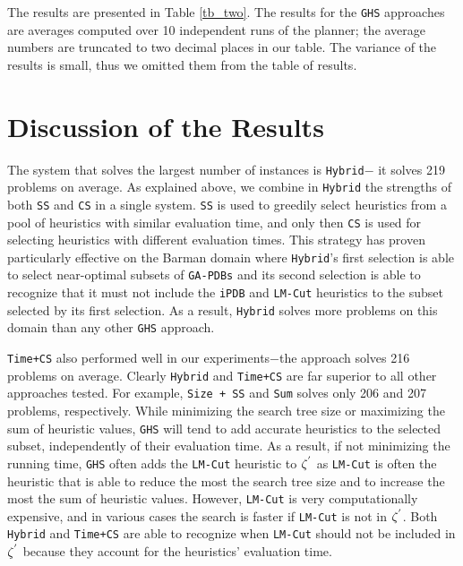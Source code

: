 The results are presented in Table \ref{tb_two}. The results for the \texttt{GHS} approaches are averages computed over 10 independent runs of the planner; the average numbers are truncated to two decimal places in our table. The variance of the results is small, thus we omitted them from the table of results.\\

\section{Discussion of the Results}
\noindent
The system that solves the largest number of instances is \texttt{Hybrid}$-$ it solves 219 problems on average. As explained above, we combine in \texttt{Hybrid} the strengths of both \texttt{SS} and \texttt{CS} in a single system. \texttt{SS} is used to greedily select heuristics from a pool of heuristics with similar evaluation time, and only then \texttt{CS} is used for selecting heuristics with different evaluation times. This strategy has proven particularly effective on the Barman domain where \texttt{Hybrid}'s first selection is able to select near-optimal subsets of \texttt{GA-PDBs} and its second selection is able to recognize that it must not include the \texttt{iPDB} and \texttt{LM-Cut} heuristics to the subset selected by its first selection. As a result, \texttt{Hybrid} solves more problems on this domain than any other \texttt{GHS} approach.

\texttt{Time+CS} also performed well in our experiments$-$the approach solves 216 problems on average. Clearly \texttt{Hybrid} and \texttt{Time+CS} are far superior to all other approaches tested. For example, \texttt{Size + SS} and \texttt{Sum} solves only 206 and 207 problems, respectively. While minimizing the search tree size or maximizing the sum of heuristic values, \texttt{GHS} will tend to add accurate heuristics to the selected subset, independently of their evaluation time. As a result, if not minimizing the running time, \texttt{GHS} often adds the \texttt{LM-Cut} heuristic to $\zeta\sp{'}$ as \texttt{LM-Cut} is often the heuristic that is able to reduce the most the search tree size and to increase the most the sum of heuristic values. However, \texttt{LM-Cut} is very computationally expensive, and in various cases the search is faster if \texttt{LM-Cut} is not in $\zeta\sp{'}$. Both \texttt{Hybrid} and \texttt{Time+CS} are able to recognize when \texttt{LM-Cut} should not be included in $\zeta\sp{'}$ because they account for the heuristics' evaluation time.

